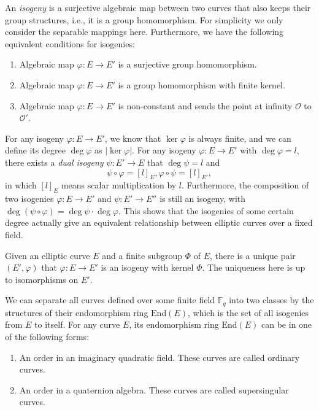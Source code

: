\begin{definition}[Isogeny] An \textit{isogeny} is a surjective algebraic map between two curves that also keeps their group structures, i.e., it is a group homomorphism. For simplicity we only consider the separable mappings here. Furthermore, we have the following equivalent conditions for isogenies:
\begin{enumerate}
    \item Algebraic map $\varphi:E\to E'$ is a surjective group homomorphism.
    \item Algebraic map $\varphi:E\to E'$ is a group homomorphism with finite kernel.
    \item Algebraic map $\varphi:E\to E'$ is non-constant and sends the point at infinity $\mathcal O$ to $\mathcal O'$.
\end{enumerate}
\end{definition}

For any isogeny $\varphi:E\to E'$, we know that $\ker \varphi$ is always finite, and we can define its degree $\deg \varphi$ as $|\ker \varphi|$. For any isogeny $\varphi: E\to E'$ with $\deg\varphi=l$, there exists a \textit{dual isogeny} $\psi:E'\to E$ that $\deg\psi=l$ and
$$
\psi\circ\varphi=[l]_E,\varphi\circ\psi=[l]_{E'},
$$
in which $[l]_E$ means scalar multiplication by $l$. Furthermore, the composition of two isogenies $\varphi:E\to E'$ and $\psi:E'\to E''$ is still an isogeny, with $\deg(\psi\circ\varphi)=\deg \psi\cdot\deg\varphi$. This shows that the isogenies of some certain degree actually give an equivalent relationship between elliptic curves over a fixed field.

\begin{proposition} 
Given an elliptic curve $E$ and a finite subgroup $\Phi$ of $E$, there is a unique pair $(E',\varphi)$ that $\varphi:E\to E'$ is an isogeny with kernel $\Phi$. The uniqueness here is up to isomorphisms on $E'$.
\end{proposition}

\begin{definition} We can separate all curves defined over some finite field $\mathbb F_q$ into two classes by the structures of their endomorphism ring $\text{End}(E)$, which is the set of all isogenies from $E$ to itself. For any curve $E$, its endomorphism ring $\text{End}(E)$ can be in one of the following forms:
\begin{enumerate}
    \item An order in an imaginary quadratic field. These curves are called ordinary curves.
    \item An order in a quaternion algebra. These curves are called supersingular curves.
\end{enumerate}
\end{definition}

